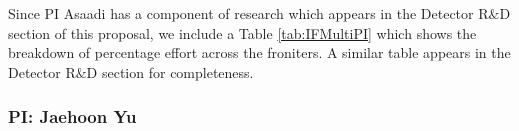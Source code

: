Since PI Asaadi has a component of research which appears in the Detector R$\&$D section of this proposal, we include a Table \ref{tab:IFMultiPI} which shows the breakdown of percentage effort across the froniters. A similar table appears in the Detector R$\&$D section for completeness.

\begin{center}
\begin{table}[h!]
    \begin{center}
    \caption{Effort Table for Investigators with multiple HEP Subprograms in the Intensity Frontier} \label{tab:IFMultiPI}
    \end{center}
\end{table}
\end{center}

\newpage
\subsubsection*{\bf PI: Jaehoon Yu}


